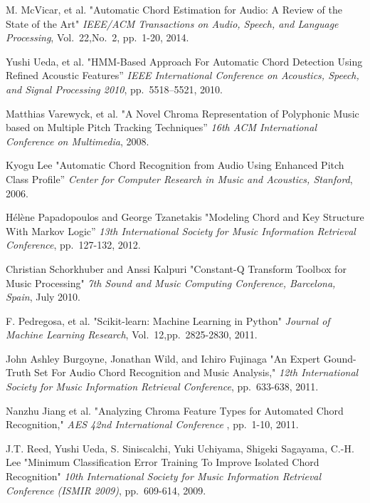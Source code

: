 \documentclass{article}
\begin{document}
\begin{thebibliography}{citations}

M. McVicar, et al.
"Automatic Chord Estimation for Audio: A Review of the State of the Art"
{\it IEEE/ACM Transactions on Audio, Speech, and Language Processing},
Vol.~22,No.~2, pp.~1-20, 2014.

Yushi Ueda, et al.
"HMM-Based Approach For Automatic Chord Detection Using Refined Acoustic Features''
{\it IEEE International Conference on Acoustics, Speech, and Signal Processing 2010},
pp.~5518--5521, 2010.

Matthias Varewyck, et al.
"A Novel Chroma Representation of Polyphonic Music based on Multiple Pitch
Tracking Techniques''
{\it 16th ACM International Conference on Multimedia},
2008.

Kyogu Lee
"Automatic Chord Recognition from Audio Using Enhanced Pitch Class Profile''
{\it Center for Computer Research in Music and Acoustics, Stanford},
2006.

Hélène Papadopoulos and George Tzanetakis
"Modeling Chord and Key Structure With Markov Logic''
{\it 13th International Society for Music Information Retrieval Conference},
pp.~127-132, 2012.

Christian Schorkhuber and Anssi Kalpuri
"Constant-Q Transform Toolbox for Music Processing" 
{\it 7th Sound and Music Computing Conference, Barcelona, Spain},
July 2010.

F. Pedregosa, et al.
"Scikit-learn: Machine Learning in Python"
{\it Journal of Machine Learning Research},
Vol.~12,pp.~2825-2830, 2011.

John Ashley Burgoyne, Jonathan Wild, and Ichiro Fujinaga
"An Expert Gound-Truth Set For Audio Chord Recognition and Music Analysis,"
{\it 12th International Society for Music Information Retrieval Conference},
pp.~633-638, 2011.

Nanzhu Jiang et al.
"Analyzing Chroma Feature Types for Automated Chord Recognition,"
{\it AES 42nd International Conference },
pp.~1-10, 2011.

J.T. Reed, Yushi Ueda, S. Siniscalchi, Yuki Uchiyama, Shigeki Sagayama, C.-H. Lee
"Minimum Classification Error Training To Improve Isolated Chord Recognition"
{\it 10th International Society for Music Information Retrieval Conference (ISMIR 2009)},
pp.~609-614, 2009.


\end{thebibliography}
\end{document}
